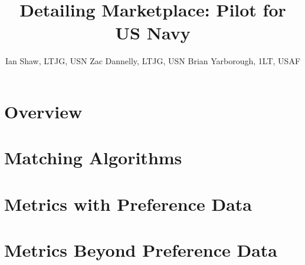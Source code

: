 \documentclass{article}
\title{Detailing Marketplace: Pilot for US Navy}
\author{Ian Shaw, LTJG, USN \quad Zac Dannelly, LTJG, USN \quad Brian Yarborough, 1LT, USAF}
\begin{document}
\maketitle



\newpage

\tableofcontents

\newpage

\section{Overview}



\section{Matching Algorithms}
\label{Matching}







\section{Metrics with Preference Data}
\label{Metrics}









\section{Metrics Beyond Preference Data}
\label{Beyond}







\end{document}
